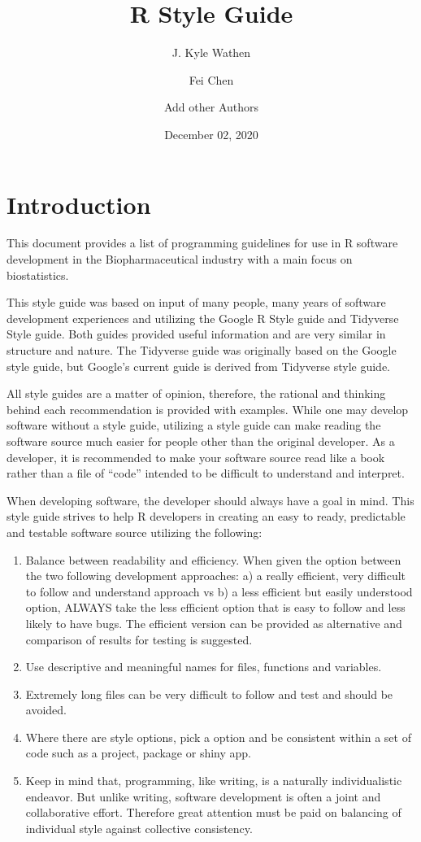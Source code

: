\documentclass[
]{book}
\title{R Style Guide}
\author{J. Kyle Wathen \and Fei Chen \and Add other Authors}
\date{December 02, 2020}
\begin{document}
\maketitle

{
\setcounter{tocdepth}{1}
\tableofcontents
}
\hypertarget{introduction}{%
\chapter{Introduction}\label{introduction}}

This document provides a list of programming guidelines for use in R software development in the Biopharmaceutical industry with a main focus on biostatistics.

This style guide was based on input of many people, many years of software development experiences and utilizing the Google R Style guide and Tidyverse Style guide. Both guides provided useful information and are very similar in structure and nature. The Tidyverse guide was originally based on the Google style guide, but Google's current guide is derived from Tidyverse style guide.

All style guides are a matter of opinion, therefore, the rational and thinking behind each recommendation is provided with examples. While one may develop software without a style guide, utilizing a style guide can make reading the software source much easier for people other than the original developer. As a developer, it is recommended to make your software source read like a book rather than a file of ``code'' intended to be difficult to understand and interpret.

When developing software, the developer should always have a goal in mind. This style guide strives to help R developers in creating an easy to ready, predictable and testable software source utilizing the following:

\begin{enumerate}
\def\labelenumi{\arabic{enumi}.}
\item
  Balance between readability and efficiency. When given the option between the two following development approaches: a) a really efficient, very difficult to follow and understand approach vs b) a less efficient but easily understood option, ALWAYS take the less efficient option that is easy to follow and less likely to have bugs. The efficient version can be provided as alternative and comparison of results for testing is suggested.
\item
  Use descriptive and meaningful names for files, functions and variables.
\item
  Extremely long files can be very difficult to follow and test and should be avoided.
\item
  Where there are style options, pick a option and be consistent within a set of code such as a project, package or shiny app.
\item
  Keep in mind that, programming, like writing, is a naturally
  individualistic endeavor. But unlike writing, software development is
  often a joint and collaborative effort. Therefore great attention must
  be paid on balancing of individual style against collective
  consistency.
\end{enumerate}
\end{document}
